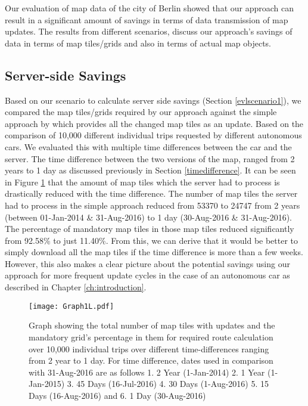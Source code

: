 Our evaluation of map data of the city of Berlin showed that our approach can result in a significant amount of savings in terms of data transmission of map updates. The results from different scenarios, discuss our approach's savings of data in terms of map tiles/grids and also in terms of actual map objects. 





\subsection{Server-side Savings}
Based on our scenario to calculate server side savings (Section \ref{evlscenario1}), we compared the map tiles/grids required by our approach against the simple approach by \citet{bastiaensen2003actmap} which provides all the changed map tiles as an update. Based on the comparison of 10,000 different individual trips requested by different autonomous cars. We evaluated this with multiple time differences between the car and the server. 
The time difference between the two versions of the map, ranged from 2 years to 1 day as discussed previously in Section \ref{timedifference}. 
It can be seen in Figure \ref{fg:scenario1} that the amount of map tiles which the server had to process is drastically reduced with the time difference. The number of map tiles the server had to process in the simple approach reduced from 53370 to 24747 from 2 years (between 01-Jan-2014 \& 31-Aug-2016) to 1 day (30-Aug-2016 \& 31-Aug-2016). The percentage of mandatory map tiles in those map tiles reduced significantly from 92.58\% to just 11.40\%. From this, we can derive that it would be better to simply download all the map tiles if the time difference is more than a few weeks. However, this also makes a clear picture about the potential savings using our approach for more frequent update cycles in the case of an autonomous car as described in Chapter \ref{ch:introduction}. \\

\begin{figure}
\centering
\texttt{[image: Graph1L.pdf]}
\caption{Graph showing the total number of map tiles with updates and the mandatory grid's percentage in them for required route calculation over 10,000 individual trips over different time-differences ranging from 2 year to 1 day. For time difference, dates used in comparison with 31-Aug-2016 are as follows 1. 2 Year (1-Jan-2014) 2. 1 Year (1-Jan-2015) 3. 45 Days (16-Jul-2016) 4. 30 Days (1-Aug-2016) 5. 15 Days (16-Aug-2016) and 6. 1 Day (30-Aug-2016)}
\label{fg:scenario1}
\end{figure}


